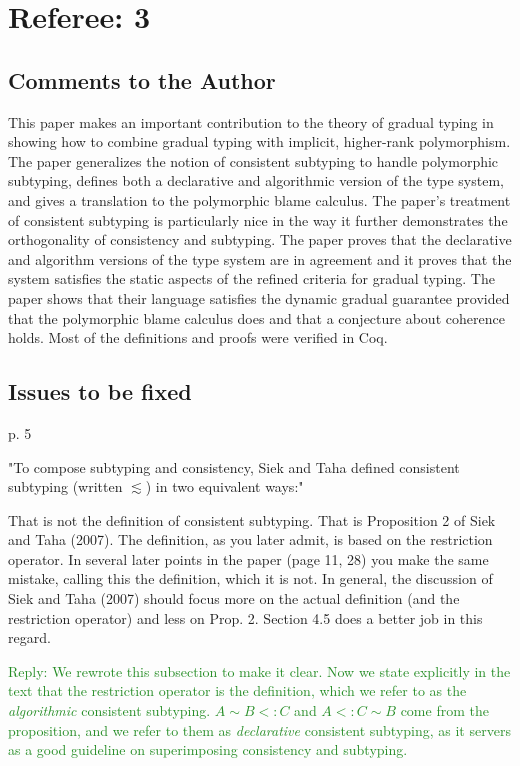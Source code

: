 \documentclass[dvipsnames]{article}
\newcommand\reply[1]{\textcolor{ForestGreen}{Reply: #1}}
\begin{document}
\section{Referee: 3 }

\subsection{Comments to the Author}


This paper makes an important contribution to the theory of gradual typing in
showing how to combine gradual typing with implicit, higher-rank polymorphism.
The paper generalizes the notion of consistent subtyping to handle polymorphic
subtyping, defines both a declarative and algorithmic version of the type
system, and gives a translation to the polymorphic blame calculus. The paper's
treatment of consistent subtyping is particularly nice in the way it further
demonstrates the orthogonality of consistency and subtyping. The paper proves
that the declarative and algorithm versions of the type system are in agreement
and it proves that the system satisfies the static aspects of the refined
criteria for gradual typing. The paper shows that their language satisfies the
dynamic gradual guarantee provided that the polymorphic blame calculus does and
that a conjecture about coherence holds. Most of the definitions and proofs were
verified in Coq.



\subsection{Issues to be fixed}

p. 5 

"To compose subtyping and consistency, Siek and Taha defined consistent 
subtyping (written $\lesssim$) in two equivalent ways:"

That is not the definition of consistent subtyping. That is Proposition 2 of
Siek and Taha (2007). The definition, as you later admit, is based on the
restriction operator. In several later points in the paper (page 11, 28) you
make the same mistake, calling this the definition, which it is not. In general,
the discussion of Siek and Taha (2007) should focus more on the actual
definition (and the restriction operator) and less on Prop. 2. Section 4.5 does
a better job in this regard.

\reply{We rewrote this subsection to make it clear. Now we state explicitly in
  the text that the restriction operator is the definition, which we refer to as
  the \emph{algorithmic} consistent subtyping. $A \sim B <: C$ and $A <:C \sim
  B$ come from the proposition, and we refer to them as \emph{declarative}
  consistent subtyping, as it servers as a good guideline on superimposing
  consistency and subtyping.}
\end{document}
